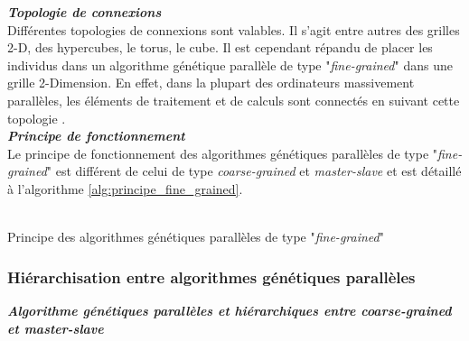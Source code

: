 	\textsl{\textbf{Topologie de connexions}}\\
	Différentes topologies de connexions sont valables. Il s'agit entre autres des grilles 2-D, des hypercubes, le torus, le cube. Il est cependant répandu de placer les individus dans un algorithme génétique parallèle de type "\emph{fine-grained}" dans une grille 2-Dimension. En effet, dans la plupart des ordinateurs massivement parallèles, les éléments de traitement et de calculs sont connectés en suivant cette topologie \cite{cant2}.\\
	
	\textsl{\textbf{Principe de fonctionnement}}\\
	Le principe de fonctionnement des algorithmes génétiques parallèles de type "\emph{fine-grained}" est différent de celui de type \emph{coarse-grained} et \emph{master-slave} et est détaillé à l'algorithme \ref{alg:principe_fine_grained}. \\
	\\
	\begin{algorithm}[H]
 		\caption{Principe des algorithmes génétiques parallèles de type "\emph{fine-grained}" \cite{nayak}}
 		\label{alg:principe_fine_grained}
 		\BlankLine
 		\BlankLine
	\end{algorithm}
	
	\subsubsection{Hiérarchisation entre algorithmes génétiques parallèles}{\label{sec:algo_hierarchique}}
	
	\textsl{\textbf{Algorithme génétiques parallèles et hiérarchiques entre \emph{coarse-grained} et \emph{master-slave}}}\\
	
